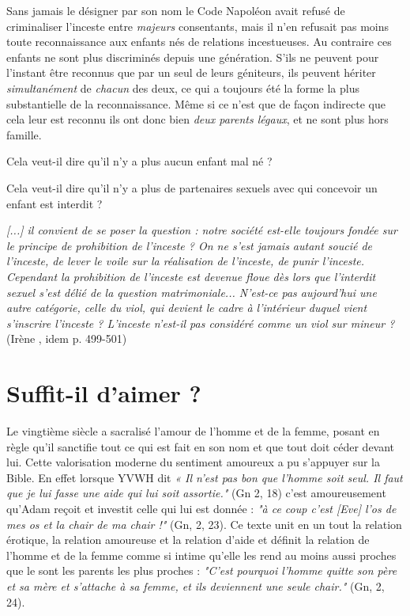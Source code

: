 Sans jamais le désigner par son nom le Code Napoléon avait refusé de criminaliser l'inceste entre \emph{majeurs} consentants, mais il n'en refusait pas moins toute reconnaissance aux enfants nés de relations incestueuses. Au contraire ces enfants ne sont plus discriminés depuis une génération. S'ils ne peuvent pour l'instant être reconnus que par un seul de leurs géniteurs, ils peuvent hériter \emph{simultanément}
 de \emph{chacun} des deux, ce qui a toujours été la forme la plus substantielle de la reconnaissance. Même si ce n'est que de façon indirecte que cela leur est reconnu ils ont donc bien  \emph{deux parents légaux}, et ne sont plus hors famille. 
 
 
 
 Cela veut-il dire qu'il n'y a plus aucun enfant mal né ? 
 
 Cela veut-il dire qu'il n'y a plus de partenaires sexuels avec qui concevoir un enfant est interdit ? 
 
 
 
 \begin{displayquote} 
\emph{[...] il convient de se poser la question : notre société est-elle toujours fondée sur le principe de prohibition de l'inceste ? On ne s'est jamais autant soucié de l'inceste, de lever le voile sur la réalisation de l'inceste, de punir l'inceste. Cependant la prohibition de l'inceste est devenue floue dès lors que l'interdit sexuel s'est délié de la question matrimoniale... N'est-ce pas aujourd'hui une autre catégorie, celle du viol, qui devient le cadre à l'intérieur duquel vient s'inscrire l'inceste ? L'inceste n'est-il pas considéré comme un viol sur mineur ?}
 (Irène , idem p. 499-501)
 \end{displayquote} 
 
 \section{Suffit-il d'aimer ?} 

Le vingtième siècle a sacralisé l’amour de l'homme et de la femme, posant en règle qu'il sanctifie tout ce qui est fait en son nom et que tout doit céder devant lui. Cette  valorisation moderne du sentiment amoureux a pu s'appuyer sur la Bible. En effet lorsque YVWH dit \emph{« Il n'est pas bon que l'homme soit seul. Il faut que je lui fasse une aide qui lui soit assortie."} (Gn 2, 18) c'est amoureusement qu'Adam reçoit et investit celle qui lui est donnée : \emph{"à ce coup c'est [Eve] l'os de mes os et la chair de ma chair !"} (Gn, 2, 23). Ce texte unit en un tout la relation érotique, la relation amoureuse et la relation d'aide et définit la relation de l’homme et de la femme comme si intime qu'elle les rend au moins aussi proches que le sont les parents les plus proches : \emph{"C'est pourquoi l'homme quitte son père et sa mère et s'attache à sa femme, et ils deviennent une seule chair."} (Gn, 2, 24). 
  

